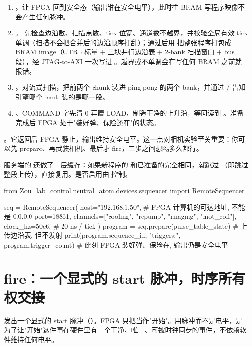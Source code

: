 \documentclass[11pt,oneside,openany]{book}
\begin{document}
\begin{enumerate}
\item {}。让 FPGA 回到安全态（输出钳在安全电平），此时往 BRAM 写程序映像不会产生任何脉冲。
\item {}。 先检查边沿数、扫描点数、tick 位宽、通道数不越界，并校验全局有效 tick 单调（扫描不会把合并后的边沿顺序打乱）；通过后用  把整张程序打包成 BRAM image（CTRL 标量 + 三块并行边沿表 + 2-bank 扫描窗口 + bus 段），经 JTAG-to-AXI 一次写进 。越界或不单调会在写任何 BRAM 之前就报错。
\item {}。对流式扫描，把前两个 chunk 装进 ping-pong 的两个 bank，并通过 / 告知引擎哪个 bank 装的是哪一段。
\item {}。COMMAND 字先清 0 再置 LOAD，制造干净的上升沿，等回读到 。准备完成后 FPGA 处于"装好弹、保险还在"的状态。
\end{enumerate}

。它返回后 FPGA 静止，输出维持安全电平。这一点对相机实验至关重要：你可以先 prepare、再武装相机、最后才 fire，三步之间想隔多久都行。

服务端的  还做了一层缓存：如果新程序的  和已准备的完全相同，就跳过 （即跳过整段上传），直接复用。是否启用由  控制。

\begin{codeblock}[Python]
from Zou_lab_control.neutral_atom.devices.sequencer import RemoteSequencer

seq = RemoteSequencer(
    host="192.168.1.50",   # FPGA 计算机的可达地址, 不能是 0.0.0.0
    port=18861,
    channels=["cooling", "repump", "imaging", "mot_coil"],
    clock_hz=50e6,          # 20 ns / tick
)
program = seq.prepare(pulse_table_state)   # 上传边沿表, 但不发射
print(program.sequence_id, "triggers:", program.trigger_count)
# 此刻 FPGA 装好弹、保险在, 输出仍是安全电平
\end{codeblock}

\section{fire：一个显式的 start 脉冲，时序所有权交接}

 发出一个显式的  start 脉冲（）。FPGA 只把当作"开始"。用脉冲而不是电平，是为了让"开始"这件事在硬件里有一个干净、唯一、可被时钟同步的事件，不依赖软件维持任何电平。
\end{document}
